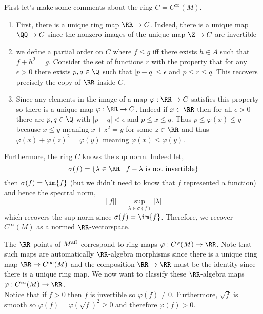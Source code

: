 \documentclass[12pt]{article}
\begin{document}
\begin{rmk}
First let's make some comments about the ring $C = C^{\infty}(M)$.
\begin{enumerate}
\item First, there is a unique ring map $\RR \to C$. Indeed, there is a unique map $\QQ \to C$ since the nonzero images of the unique map $\Z \to C$ are invertible

\item we define a partial order on $C$ where $f \le g$ iff there exists $h \in A$ such that $f + h^2 = g$. Consider the set of functions $r$ with the property that for any $\epsilon > 0$ there exists $p,q \in \Q$ such that $|p - q | \le \epsilon$ and $p \le r \le q$. This recovers precisely the copy of $\RR$ inside $C$.

\item Since any elements in the image of a map $\varphi : \RR \to C$ satisfies this property so there is a unique map $\varphi : \RR \to C$. Indeed if $x \in \RR$ then for all $\epsilon > 0$ there are $p,q \in \Q$ with $|p - q| < \epsilon$ and $p \le x \le q$. Thus $p \le \varphi(x) \le q$ because $x \le y$ meaning $x + z^2 = y$ for some $z \in \RR$ and thus $\varphi(x) + \varphi(z)^2 = \varphi(y)$ meaning $\varphi(x) \le \varphi(y)$.
\end{enumerate} 
Furthermore, the ring $C$ knows the sup norm. Indeed let,
\[ \sigma(f) = \{ \lambda \in \RR \mid f - \lambda \text{ is not invertible} \} \]
then $\sigma(f) = \im{f}$ (but we didn't need to know that $f$ represented a function) and hence the spectral norm,
\[ || f || = \sup_{\lambda \in \sigma(f)} |\lambda| \]
which recovers the sup norm since $\sigma(f) = \im{f}$. Therefore, we recover $C^{\infty}(M)$ as a normed $\RR$-vectorspace. 
\end{rmk}


\begin{rmk}
The $\RR$-points of $M^{\mathrm{aff}}$ correspond to ring maps $\varphi : C^{\varphi}(M) \to \RR$. Note that such maps are automatically $\RR$-algebra morphisms since there is a unique ring map $\RR \to C^{\infty}(M)$ and the composition $\RR \to \RR$ must be the identity since there is a unique ring map. We now want to classify these $\RR$-algebra maps $\varphi : C^{\infty}(M) \to \RR$. 
\bigskip\\
Notice that if $f > 0$ then $f$ is invertible so $\varphi(f) \neq 0$. Furthermore, $\sqrt{f}$ is smooth so $\varphi(f) = \varphi(\sqrt{f})^2 \ge 0$ and therefore $\varphi(f) > 0$. 
\end{rmk}
\end{document}
